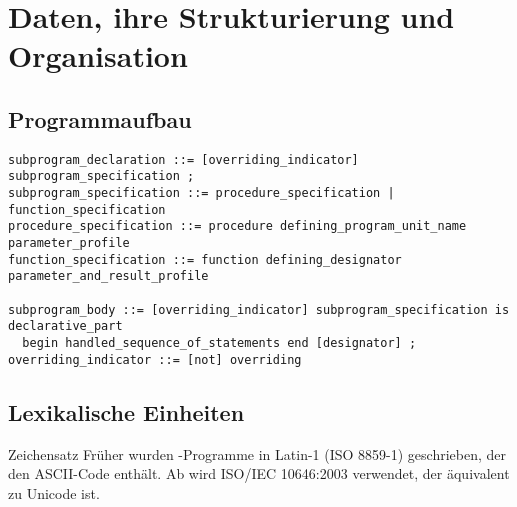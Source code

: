 \chapter{%
    Daten, ihre Strukturierung und Organisation%
}

\section{%
    Programmaufbau%
}

\begin{lstlisting}[language=ebnf,
emph={procedure,function,is,begin,end,not,overriding},
emphstyle=\underbar]
subprogram_declaration ::= [overriding_indicator] subprogram_specification ;
subprogram_specification ::= procedure_specification | function_specification
procedure_specification ::= procedure defining_program_unit_name parameter_profile
function_specification ::= function defining_designator parameter_and_result_profile

subprogram_body ::= [overriding_indicator] subprogram_specification is declarative_part
  begin handled_sequence_of_statements end [designator] ;
overriding_indicator ::= [not] overriding
\end{lstlisting}

\section{%
    Lexikalische Einheiten%
}

\begin{Def}{Zeichensatz}
    Früher wurden \Ada{}-Programme in Latin-1 (ISO 8859-1) geschrieben, der den
    ASCII-Code enthält.
    Ab  wird ISO/IEC 10646:2003 verwendet, der
    äquivalent zu Unicode ist.
\end{Def}

